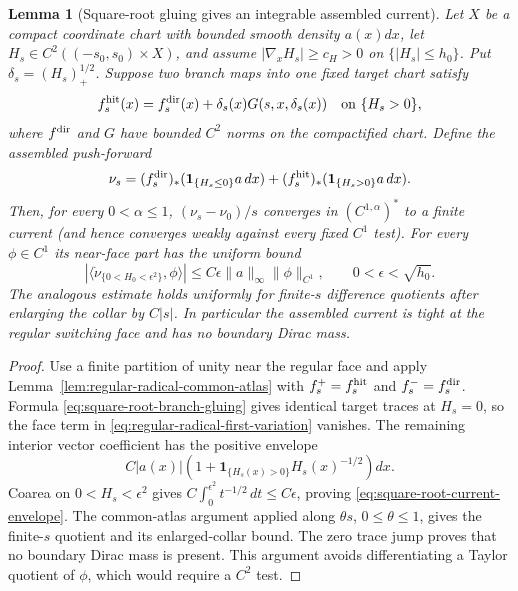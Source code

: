 \documentclass[11pt]{article}
\newtheorem{lemma}[theorem]{Lemma}
\newcommand{\one}{\mathbf 1}
\begin{document}
\begin{lemma}[Square-root gluing gives an integrable assembled current]
\label{lem:square-root-gluing-current}
Let $X$ be a compact coordinate chart with bounded smooth density $a(x)dx$,
let $H_s\in C^2((-s_0,s_0)\times X)$, and assume
$|\nabla_xH_s|\ge c_H>0$ on $\{|H_s|\le h_0\}$.  Put
$\delta_s=(H_s)_+^{1/2}$.  Suppose two branch maps into one fixed target
chart satisfy
\begin{equation}
\label{eq:square-root-branch-gluing}
 f_s^{\rm hit}(x)=f_s^{\rm dir}(x)
 +\delta_s(x)G(s,x,\delta_s(x))
 \quad\text{on }\{H_s>0\},
\end{equation}
where $f^{\rm dir}$ and $G$ have bounded $C^2$ norms on the compactified
chart.  Define the assembled push-forward
\[
 \nu_s=(f_s^{\rm dir})_*(\one_{\{H_s\le0\}}a\,dx)
       +(f_s^{\rm hit})_*(\one_{\{H_s>0\}}a\,dx).
\]
Then, for every $0<\alpha\le1$, $(\nu_s-\nu_0)/s$ converges in
$(C^{1,\alpha})^*$ to a finite current (and hence converges weakly against
every fixed $C^1$ test).
For every $\phi\in C^1$ its near-face part has the uniform bound
\begin{equation}
\label{eq:square-root-current-envelope}
 \left|\langle\dot\nu_{\{0<H_0<\epsilon^2\}},\phi\rangle\right|
 \le C\epsilon\|a\|_\infty\|\phi\|_{C^1},
 \qquad 0<\epsilon<\sqrt{h_0}.
\end{equation}
The analogous estimate holds uniformly for finite-$s$ difference quotients
after enlarging the collar by $C|s|$.  In particular the assembled current
is tight at the regular switching face and has no boundary Dirac mass.
\end{lemma}

\begin{proof}
Use a finite partition of unity near the regular face and apply
Lemma~\ref{lem:regular-radical-common-atlas} with
$f_s^+=f_s^{\rm hit}$ and $f_s^-=f_s^{\rm dir}$.  Formula
\eqref{eq:square-root-branch-gluing} gives identical target traces at
$H_s=0$, so the face term in
\eqref{eq:regular-radical-first-variation} vanishes.  The remaining
interior vector coefficient has the positive envelope
\[
 C|a(x)|\left(1+
 \one_{\{H_s(x)>0\}}H_s(x)^{-1/2}\right)dx.
\]
Coarea on $0<H_s<\epsilon^2$ gives
$C\int_0^{\epsilon^2}t^{-1/2}\,dt\le C\epsilon$, proving
\eqref{eq:square-root-current-envelope}.  The common-atlas argument applied
along $\theta s$, $0\le\theta\le1$, gives the finite-$s$ quotient and its
enlarged-collar bound.  The zero trace jump proves that no boundary Dirac
mass is present.  This argument avoids differentiating a Taylor quotient of
$\phi$, which would require a $C^2$ test.
\end{proof}
\end{document}
